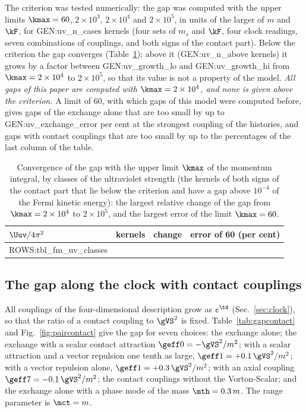 The criterion was tested numerically: the gap was computed with the upper limits $\kmax=60$,
$2\times10^{3}$, $2\times10^{4}$ and $2\times10^{5}$, in units of the larger of $m$ and $\kF$, for
{{GEN:uv_n_cases}} kernels (four sets of $m_s$ and $\kF$, four clock readings, seven combinations of
couplings, and both signs of the contact part). Below the criterion the gap converges
(Table~\ref{tab:uvclasses}); above it ({{GEN:uv_n_above}} kernels)
it grows by a factor between {{GEN:uv_growth_lo}} and {{GEN:uv_growth_hi}} from $\kmax=2\times10^{4}$
to $2\times10^{5}$, so that its value is not a property of the model. \emph{All gaps of this paper are
computed with $\kmax=2\times10^{4}$, and none is given above the criterion.} A limit of 60, with
which gaps of this model were computed before, gives gaps of the exchange alone that are too small
by up to {{GEN:uv_exchange_error}} per cent at the strongest coupling of the histories, and gaps with
contact couplings that are too small by up to the percentages of the last column of the table.

\begin{table}
\caption{\label{tab:uvclasses}Convergence of the gap with the upper limit $\kmax$ of the momentum
integral, by classes of the ultraviolet strength (the kernels of both signs of the contact part that
lie below the criterion and have a gap above $10^{-4}$ of the Fermi kinetic energy): the largest
relative change of the gap from
$\kmax=2\times10^{4}$ to $2\times10^{5}$, and the largest error of the limit $\kmax=60$.}
\begin{ruledtabular}
\begin{tabular}{lccc}
$\Uuv/4\pi^{2}$ & kernels & change & error of 60 (per cent) \\
\hline
{{ROWS:tbl_fm_uv_classes}}
\end{tabular}
\end{ruledtabular}
\end{table}

\subsection{The gap along the clock with contact couplings}

All couplings of the four-dimensional description grow as $e^{\td}$ (Sec.~\ref{sec:clock}), so that
the ratio of a contact coupling to $\gVS^{2}$ is fixed. Table~\ref{tab:gapcontact} and
Fig.~\ref{fig:paircontact} give the gap for seven choices: the exchange alone; the exchange with a
scalar contact attraction $\geff0=-\gVS^{2}/m^{2}$; with a scalar attraction and a vector repulsion
one tenth as large, $\geff1=+0.1\,\gVS^{2}/m^{2}$; with a vector repulsion alone,
$\geff1=+0.3\,\gVS^{2}/m^{2}$; with an axial coupling $\geff7=-0.1\,\gVS^{2}/m^{2}$; the contact
couplings without the Vorton-Scalar; and the exchange alone with a phase mode of the mass
$\mth=0.3\,m$. The range parameter is $\mct=m$.

